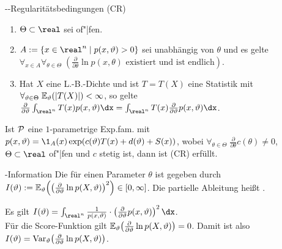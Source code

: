 \begin{Def}{--Regularitätsbedingungen (CR)}
    \begin{enumerate}
        \item
        $\Theta \subset \real$ sei of"|fen.

        \item
        $A := \{x \in \real^n \;|\; p(x, \theta) > 0\}$ sei unabhängig von $\theta$ und es gelte\\
        $\forall_{x \in A} \forall_{\theta \in \Theta}\; (\frac{\partial}{\partial \theta}
        \ln p(x, \theta) \text{ existiert und ist endlich})$.

        \item
        Hat $X$ eine L.-B.-Dichte und ist $T = T(X)$ eine Statistik mit
        $\forall_{\theta \in \Theta}\; \EE_\theta(|T(X)|) < \infty$, so gelte
        $\frac{\partial}{\partial \theta} \int_{\real^n} T(x) p(x, \theta) \dx =
        \int_{\real^n} T(x) \frac{\partial}{\partial \theta} p(x, \theta) \dx$.
    \end{enumerate}
\end{Def}

\begin{Bem}
    Ist $\P$ eine $1$-parametrige Exp.fam. mit
    $p(x, \theta) = \1_A(x) \exp(c(\theta)T(x) + d(\theta) + S(x))$, wobei
    $\forall_{\theta \in \Theta}\; \frac{\partial}{\partial \theta} c(\theta) \not= 0$,
    $\Theta \subset \real$ of"|fen und $c$ stetig ist, dann ist (CR) erfüllt.
\end{Bem}

\linie

\begin{Def}{-Information}
    Die  für einen Parameter $\theta$ ist gegeben durch
    $I(\theta) := \EE_\theta\!\left(\left(\frac{\partial}{\partial \theta} \ln p(X, \theta)
    \right)^2\right) \in [0, \infty]$.
    Die partielle Ableitung heißt .
\end{Def}

\begin{Bem}
    Es gilt
    $I(\theta) = \int_{\real^n} \frac{1}{p(x, \theta)} \cdot \left(\frac{\partial}{\partial \theta}
    p(x, \theta)\right)^2 \dx$.\\
    Für die Score-Funktion gilt
    $\EE_\theta\!\left(\frac{\partial}{\partial \theta} \ln p(X, \theta)\right) = 0$.
    Damit ist also $I(\theta) =
    \Var_\theta\!\left(\frac{\partial}{\partial \theta} \ln p(X, \theta)\right)$.
\end{Bem}

